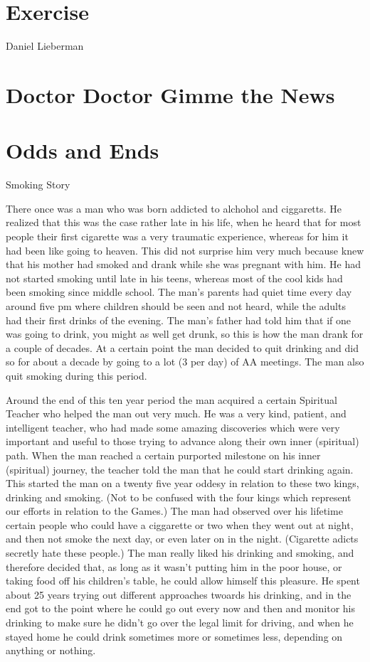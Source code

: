 \documentclass[12pt,letterpaper]{book}
\begin{document}
\chapter{Exercise}
Daniel Lieberman
\chapter{Doctor Doctor Gimme the News}
\chapter{Odds and Ends}

Smoking Story

There once was a man who was born addicted to alchohol and ciggaretts. He realized that this was the case rather late in his life, when he heard that for most people their first cigarette was a very traumatic experience, whereas for him it had been like going to heaven. This did not surprise him very much because knew that his mother had smoked and drank while she was pregnant with him. He had not started smoking until late in his teens, whereas most of the cool kids had been smoking since middle school. The man's parents had quiet time every day around five pm where children should be seen and not heard, while the adults had their first drinks of the evening. The man's father had told him that if one was going to drink, you might as well get drunk, so this is how the man drank for a couple of decades. At a certain point the man decided to quit drinking and did so for about a decade by going to a lot (3 per day) of AA meetings. The man also quit smoking during this period.

Around the end of this ten year period the man acquired a certain Spiritual Teacher who helped the man out very much. He was a very kind, patient, and intelligent teacher, who had made some amazing discoveries which were very important and useful to those trying to advance along their own inner (spiritual) path. When the man reached a certain purported milestone on his inner (spiritual) journey, the teacher told the man that he could start drinking again. This started the man on a twenty five year oddesy in relation to these two kings, drinking and smoking. (Not to be confused with the four kings which represent our efforts in relation to the Games.) The man had observed over his lifetime certain people who could have a ciggarette or two when they went out at night, and then not smoke the next day, or even later on in the night. (Cigarette adicts secretly hate these people.) The man really liked his drinking and smoking, and therefore decided that, as long as it wasn't putting him in the poor house, or taking food off his children's table, he could allow himself this pleasure. He spent about 25 years trying out different approaches twoards his drinking, and in the end got to the point where he could go out every now and then and monitor his drinking to make sure he didn't go over the legal limit for driving, and when he stayed home he could drink sometimes more or sometimes less, depending on anything or nothing.
\end{document}
